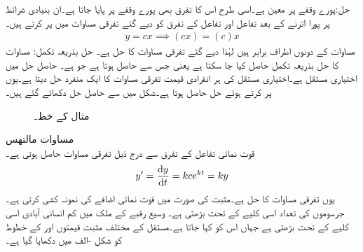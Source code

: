 حل:پورے وقفے پر  معین ہے۔اسی طرح اس کا تفرق  بھی پورے وقفے پر پایا جاتا ہے۔ان بنیادی شرائط پر پورا اترنے کے بعد تفاعل اور تفاعل کے تفرق کو دیے گئے تفرقی مساوات میں پر کرتے ہیں۔
\begin{align*}
y=cx \implies (cx)=(c)x
\end{align*}
مساوات کے دونوں اطراف برابر ہیں لہٰذا  دیے گئے تفرقی مساوات کا حل ہے۔
حل بذریعہ تکمل: مساوات  کا حل بذریعہ تکمل حاصل کیا جا سکتا ہے یعنی  جس سے  حاصل ہوتا ہے جو  ہے۔ حاصل حل میں  اختیاری مستقل ہے۔اختیاری مستقل کی ہر انفرادی قیمت تفرقی مساوات کا ایک منفرد حل دیتا ہے۔یوں  پر کرتے ہوئے  حل حاصل ہوتا ہے۔شکل  میں  سے حاصل حل دکھائے گئے ہیں۔
\begin{figure}
\centering
{}
\caption{مثال  کے خط۔}
\label{شکل_مثال_تفرقی_اول_حل_نسل_الف}
\end{figure}
\quad مساوات مالتھس\\
قوت نمائی تفاعل  کے تفرق سے درج ذیل تفرقی مساوات حاصل ہوتی ہے۔
\begin{align}\label{مساوات_سادہ_اول_مالتھس_الف}
y'=\frac{\dif y}{\dif t}=k ce^{kt}=ky
\end{align}
یوں  تفرقی مساوات کا حل  ہے۔مثبت  کی صورت میں  قوت نمائی اضافے کی نمونہ کشی کرتی ہے۔جرسوموں کی تعداد اسی کلیے کے تحت بڑھتی ہے۔ وسیع رقبے کے ملک میں کم انسانی آبادی اسی کلیے کے تحت بڑھتی ہے جہاں اس کو  کہا جاتا ہے۔مستقل  کے مختلف مثبت قیمتوں اور  کے خطوط کو شکل -الف میں دکھایا گیا ہے۔ 

